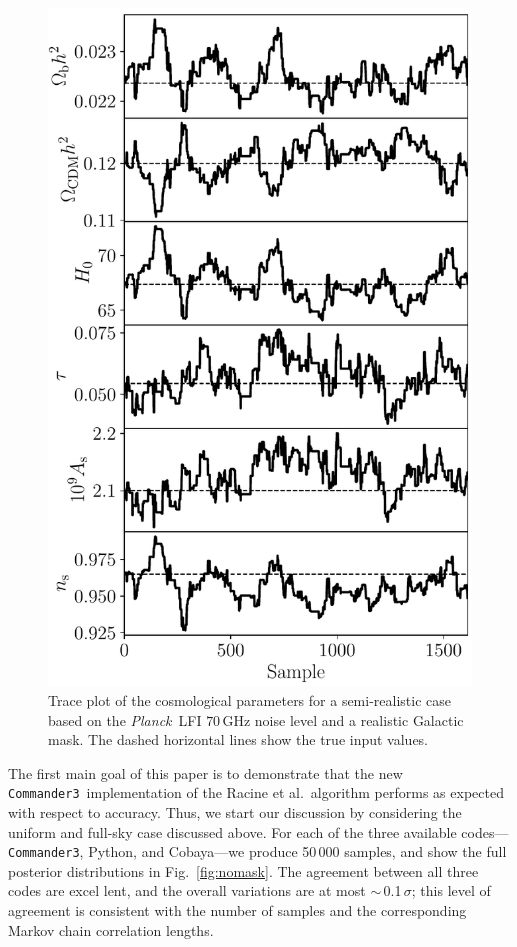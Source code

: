 \documentclass[twocolumn]{../common/aa}
\def\Planck{\emph{Planck}}
\def\commanderthree{\texttt{Commander3}}
\begin{document}
\begin{figure}
	\centering
	\includegraphics[width=\linewidth]{figures/realistic_chain.pdf}
	\caption{\label{fig:traceplot}Trace plot of the cosmological parameters for a semi-realistic case based on the \Planck\ LFI $70\,$GHz noise level and a realistic Galactic mask. The dashed horizontal lines show the true input values.}
\end{figure}


The first main goal of this paper is to demonstrate that the new \commanderthree\ implementation of the Racine et al.\ algorithm performs as expected with respect to accuracy. Thus, we start our discussion by considering the uniform and full-sky case discussed above. For each of the three available codes---\commanderthree, Python, and Cobaya---we produce 50\,000 samples, and show the full posterior distributions in Fig.~\ref{fig:nomask}. The agreement between all three codes are excel lent, and the overall variations are at most $\sim$\,0.1$\,\sigma$; this level of agreement is consistent with the number of samples and the corresponding Markov chain correlation lengths. 
\end{document}
